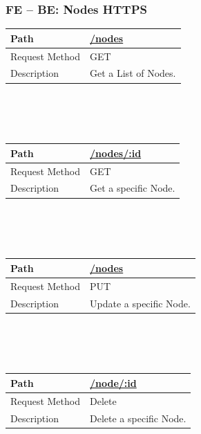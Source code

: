 \documentclass{scrreprt}
\begin{document}
\subsubsection{FE -- BE: Nodes HTTPS}
\begin{tabularx}{12cm}{l|l}
	Path & \url{/nodes} \\\hline
	Request Method & GET \\\hline
	Description & Get a List of Nodes.
\end{tabularx}
\\
\\ \\
\begin{tabularx}{12cm}{l|l}
	Path & \url{/nodes/:id} \\\hline
	Request Method & GET \\\hline
	Description & Get a specific Node.
\end{tabularx}
\\
\\ \\
\begin{tabularx}{12cm}{l|l}
	Path & \url{/nodes} \\\hline
	Request Method & PUT \\\hline
	Description & Update a specific Node.
\end{tabularx}
\\
\\ \\
\begin{tabularx}{12cm}{l|l}
	Path & \url{/node/:id} \\\hline
	Request Method & Delete \\\hline
	Description & Delete a specific Node.
\end{tabularx}
\\
\\ \\
\end{document}

